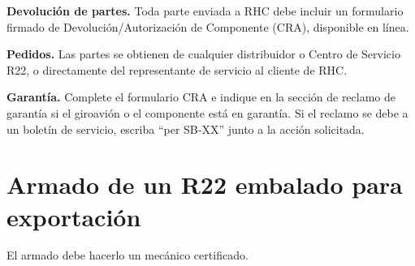 \textbf{Devolución de partes.} Toda parte enviada a RHC debe incluir un formulario firmado de Devolución/Autorización de Componente (CRA), disponible en línea.

\textbf{Pedidos.} Las partes se obtienen de cualquier distribuidor o Centro de Servicio R22, o directamente del representante de servicio al cliente de RHC.

\textbf{Garantía.} Complete el formulario CRA e indique en la sección de reclamo de garantía si el giroavión o el componente está en garantía. Si el reclamo se debe a un boletín de servicio, escriba ``per SB-XX'' junto a la acción solicitada.

\section{Armado de un R22 embalado para exportación}

\begin{nota}
El armado debe hacerlo un mecánico certificado.
\end{nota}

